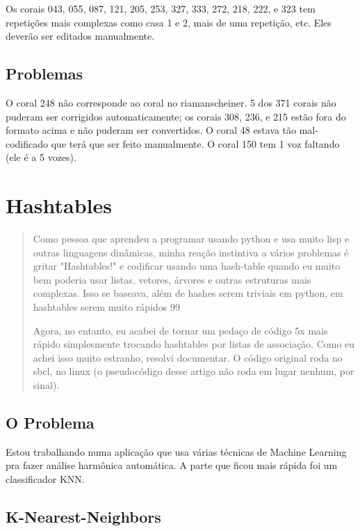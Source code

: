 \documentclass[12pt,brazil]{book}
\begin{document}
Os corais 043, 055, 087, 121, 205, 253, 327, 333, 272, 218, 222, e 323
tem repetições mais complexas como casa 1 e 2, mais de uma repetição,
etc. Eles deverão ser editados manualmente.

\section{Problemas}
\label{sec:problemas}

O coral 248 não corresponde ao coral no riamanscheiner. 5 dos 371
corais não puderam ser corrigidos automaticamente; os corais 308, 236,
e 215 estão fora do formato acima e não puderam ser convertidos. O
coral 48 estava tão mal-codificado que terá que ser feito manualmente.
O coral 150 tem 1 voz faltando (ele é a 5 vozes).



\chapter{Hashtables}
\label{chap:hash}

\begin{abstract}
  Como pessoa que aprendeu a programar usando python e usa muito lisp
  e outras linguagens dinâmicas, minha reação instintiva a vários
  problemas é gritar "Hashtables!" e codificar usando uma hash-table
  quando eu muito bem poderia usar listas, vetores, árvores e outras
  estruturas mais complexas. Isso se baseava, além de hashes serem
  triviais em python, em hashtables serem muito rápidos 99%

  Agora, no entanto, eu acabei de tornar um pedaço de código 5x mais
  rápido simplesmente trocando hashtables por listas de
  associação. Como eu achei isso muito estranho, resolvi documentar. O
  código original roda no sbcl, no linux (o pseudocódigo desse artigo
  não roda em lugar nenhum, por sinal).
  
\end{abstract}

\section{O Problema}
\label{sec:prob}


Estou trabalhando numa aplicação que usa várias técnicas de Machine
Learning pra fazer análise harmônica automática. A parte que ficou
mais rápida foi um classificador KNN.

\section{K-Nearest-Neighbors}
\label{knn}
\end{document}
